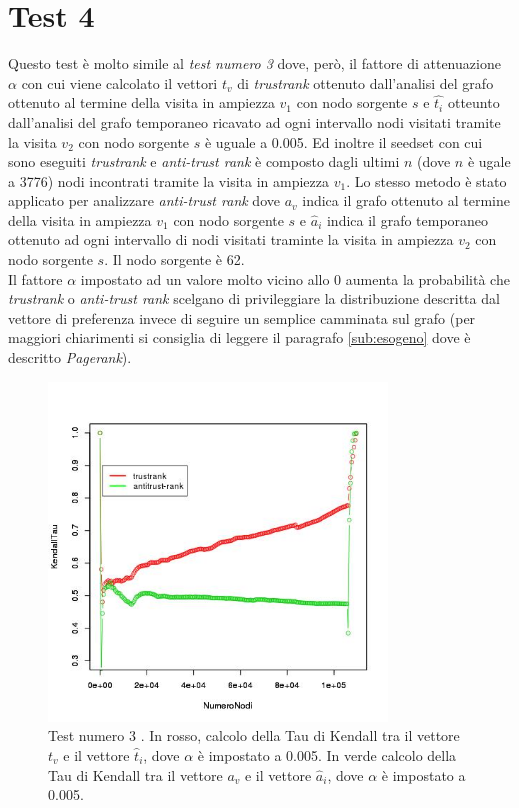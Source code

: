 \section{Test 4}
Questo test è molto simile al \textit{test numero 3} dove, però, il fattore di attenuazione \(\alpha\) con cui viene calcolato il vettori \(t_v\) di \textit{trustrank} ottenuto dall'analisi del grafo ottenuto al termine della visita in ampiezza \(v_1\) con nodo sorgente \(s\) e \(\hat{t_i}\) otteunto dall'analisi del grafo temporaneo ricavato ad ogni intervallo nodi visitati tramite la visita \(v_2\) con nodo sorgente \(s\) è uguale a 0.005. Ed inoltre il seedset con cui sono eseguiti \textit{trustrank} e \textit{anti-trust rank} è composto dagli ultimi \(n\) (dove \(n\) è ugale a 3776) nodi incontrati tramite la visita in ampiezza \(v_1\). Lo stesso metodo è stato applicato per analizzare \textit{anti-trust rank} dove \(a_v\) indica il grafo ottenuto al termine della visita in ampiezza \(v_1\) con nodo sorgente \(s\) e \(\hat{a}_i\) indica il grafo temporaneo ottenuto ad ogni intervallo di nodi visitati traminte la visita in ampiezza \(v_2\) con nodo sorgente \(s\). Il nodo sorgente è 62.\\
Il fattore \(\alpha\) impostato ad un valore molto vicino allo 0 aumenta la probabilità che \textit{trustrank} o \textit{anti-trust rank} scelgano di privileggiare la distribuzione descritta dal vettore di preferenza invece di seguire un semplice camminata sul grafo (per maggiori chiarimenti si consiglia di leggere il paragrafo \ref{sub:esogeno} dove è descritto \textit{Pagerank}).
\begin{figure}
 \centering
 \includegraphics[height=9cm]{immagini/test3/coplotTrustAnti_Mode1_set3776_62_alpha0005}
  \caption{Test numero 3 . In rosso, calcolo della Tau di Kendall tra il vettore $t_v$ e il vettore $\hat{t}_i$, dove $\alpha$ è impostato a 0.005. In verde calcolo della Tau di Kendall tra il vettore $a_v$ e il vettore $\hat{a}_i$, dove $\alpha$ è impostato a 0.005.}
 \label{fig:test3coplotTrustAntiModeB620005}
\end{figure}

